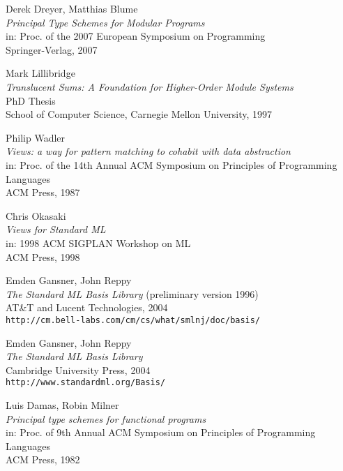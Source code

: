 \documentclass[twoside,titlepage]{article}
\newcommand{\void}[1]{}
\begin{document}
\begin{appendix}
\begin{thebibliography}{MTHM97}
Derek Dreyer, Matthias Blume \\
{\it Principal Type Schemes for Modular Programs} \\
in: Proc. of the 2007 European Symposium on Programming \\
Springer-Verlag, 2007

\void{
\bibitem[DHCK06]{typeclasses}
Derek Dreyer, Robert Harper, Manuel Chakravarty, Gabriele Keller \\
{\it Modular Type Classes} \\
Draft, 2006 \\
{\small\tt{http://www.cs.cmu.edu/~rwh/papers/mtc/apr06.pdf}}
}

Mark Lillibridge \\
{\it Translucent Sums: A Foundation for Higher-Order Module Systems} \\
PhD Thesis \\
School of Computer Science, Carnegie Mellon University, 1997

Philip Wadler \\
{\it Views: a way for pattern matching to cohabit with data abstraction} \\
in: Proc. of the 14th Annual ACM Symposium on Principles of Programming Languages \\
ACM Press, 1987

Chris Okasaki \\
{\it Views for {Standard ML}} \\
in: 1998 ACM SIGPLAN Workshop on ML \\
ACM Press, 1998

Emden Gansner, John Reppy \\
{\it The Standard ML Basis Library}
(preliminary version 1996) \\
AT\&T and Lucent Technologies, 2004 \\
{\small\tt{http://cm.bell-labs.com/cm/cs/what/smlnj/doc/basis/}}

Emden Gansner, John Reppy \\
{\it The Standard ML Basis Library} \\
Cambridge University Press, 2004 \\
{\small\tt{http://www.standardml.org/Basis/}}

Luis Damas, Robin Milner \\
{\it Principal type schemes for functional programs} \\
in: Proc. of 9th Annual ACM Symposium on Principles of Programming Languages \\
ACM Press, 1982


\end{thebibliography}
\end{appendix}
\end{document}
